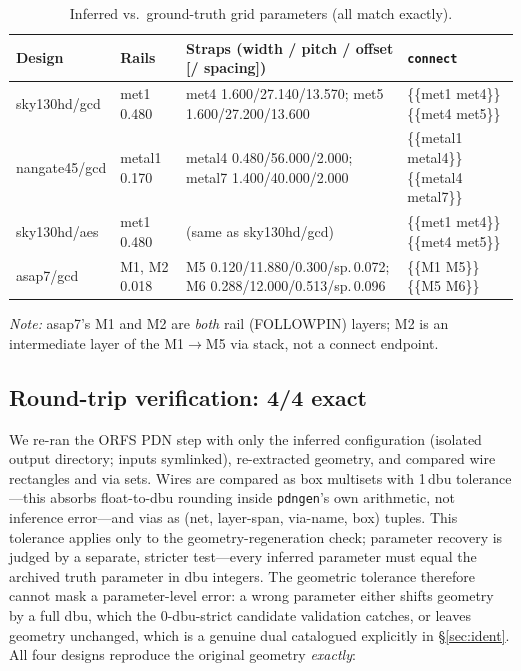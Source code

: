 \documentclass[11pt]{article}
\begin{document}
\begin{table}[h]
\centering
\setlength{\tabcolsep}{4pt}
\small
\caption{Inferred vs.\ ground-truth grid parameters (all match exactly).}
\label{tab:recovery}
\begin{tabular}{l>{\raggedright\arraybackslash}p{1.9cm}>{\raggedright\arraybackslash}p{6.0cm}>{\raggedright\arraybackslash}p{3.4cm}}
\toprule
Design & Rails & Straps (width / pitch / offset [/ spacing]) & \texttt{connect} \\
\midrule
sky130hd/gcd &
met1 0.480 &
met4 1.600/27.140/13.570; \newline met5 1.600/27.200/13.600 &
\{\{met1 met4\}\} \newline \{\{met4 met5\}\} \\
nangate45/gcd &
metal1 0.170 &
metal4 0.480/56.000/2.000; \newline metal7 1.400/40.000/2.000 &
\{\{metal1 metal4\}\} \newline \{\{metal4 metal7\}\} \\
sky130hd/aes &
met1 0.480 &
(same as sky130hd/gcd) &
\{\{met1 met4\}\} \newline \{\{met4 met5\}\} \\
asap7/gcd &
M1, M2 0.018 &
M5 0.120/11.880/0.300/sp.\,0.072; \newline M6 0.288/12.000/0.513/sp.\,0.096 &
\{\{M1 M5\}\} \newline \{\{M5 M6\}\} \\
\bottomrule
\end{tabular}
\end{table}
\noindent\textit{Note:} asap7's M1 and M2 are \emph{both} rail
(FOLLOWPIN) layers; M2 is an intermediate layer of the M1$\to$M5 via
stack, not a connect endpoint.

\subsection{Round-trip verification: 4/4 exact}

We re-ran the ORFS PDN step with only the inferred configuration
(isolated output directory; inputs symlinked), re-extracted geometry, and
compared wire rectangles and via sets.  Wires are compared as box
multisets with 1\,dbu tolerance---this absorbs float-to-dbu rounding
inside \texttt{pdngen}'s own arithmetic, not inference error---and vias
as (net, layer-span, via-name, box) tuples.  This tolerance applies only
to the geometry-regeneration check; parameter recovery is judged by a
separate, stricter test---every inferred parameter must equal the
archived truth parameter in dbu integers.  The geometric tolerance
therefore cannot mask a parameter-level error: a wrong parameter either
shifts geometry by a full dbu, which the 0-dbu-strict candidate
validation catches, or leaves geometry unchanged, which is a genuine
dual catalogued explicitly in \S\ref{sec:ident}.  All four
designs reproduce the original geometry \emph{exactly}:
\end{document}
